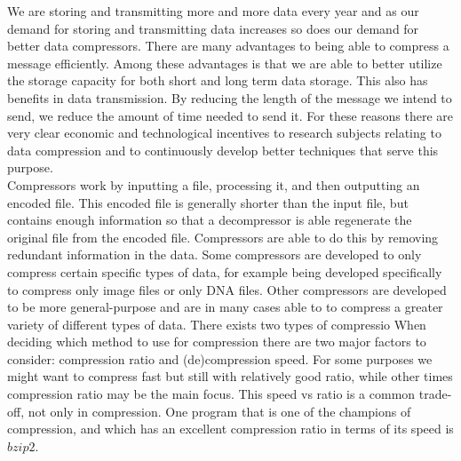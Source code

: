 \documentclass{article}
\begin{document}
We are storing and transmitting more and more data every year and as our demand for storing and transmitting data increases so does our demand for better data compressors. %
There are many advantages to being able to compress a message efficiently. Among these advantages is that we are able to better utilize the storage capacity for both short and long term data storage. This also has benefits in data transmission. By reducing the length of the message we intend to send, we reduce the amount of time needed to send it.
For these reasons there are very clear economic and technological incentives to research subjects relating to data compression and to continuously develop better techniques that serve this purpose.
\\
Compressors work by inputting a file, processing it, and then outputting an encoded file. This encoded file is generally shorter than the input file, but contains enough information so that a decompressor is able regenerate the original file from the encoded file. Compressors are able to do this by removing redundant information in the data. %
Some compressors are developed to only compress certain specific types of data, for example being developed specifically to compress only image files or only DNA files.
Other compressors are developed to be more general-purpose and are in many cases able to to compress a greater variety of different types of data.
There exists two types of compressio
When deciding which method to use for compression there are two major factors to consider: compression ratio and (de)compression speed. %
For some purposes we might want to compress fast but still with relatively good ratio, while other times compression ratio may be the main focus. This speed vs ratio is a common trade-off, not only in compression.
One program that is one of the champions of compression, and which has an excellent compression ratio in terms of its speed is \(bzip2\). %
\end{document}
